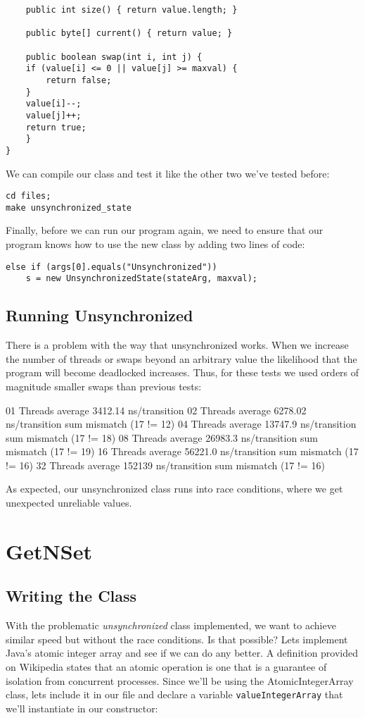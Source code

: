 \documentclass[11pt]{article}
\begin{document}
\begin{verbatim}
    public int size() { return value.length; }

    public byte[] current() { return value; }

    public boolean swap(int i, int j) {
	if (value[i] <= 0 || value[j] >= maxval) {
	    return false;
	}
	value[i]--;
	value[j]++;
	return true;
    }
}
\end{verbatim}

We can compile our class and test it like the other two we've
tested before:

\begin{verbatim}
cd files;
make unsynchronized_state
\end{verbatim}

Finally, before we can run our program again, we need to ensure that
our program knows how to use the new class by adding two lines of code:
\begin{verbatim}
else if (args[0].equals("Unsynchronized"))
    s = new UnsynchronizedState(stateArg, maxval);
\end{verbatim}

\subsection{Running Unsynchronized}
\label{sec-3-1}
There is a problem with the way that unsynchronized works. When we
increase the number of threads or swaps beyond an arbitrary value
the likelihood that the program will become deadlocked increases.
Thus, for these tests we used orders of magnitude smaller swaps
than previous tests:

01 Threads average 3412.14 ns/transition
02 Threads average 6278.02 ns/transition
sum mismatch (17 != 12)
04 Threads average 13747.9 ns/transition
sum mismatch (17 != 18)
08 Threads average 26983.3 ns/transition
sum mismatch (17 != 19)
16 Threads average 56221.0 ns/transition
sum mismatch (17 != 16)
32 Threads average 152139 ns/transition
sum mismatch (17 != 16)

As expected, our unsynchronized class runs into race conditions, where we
get unexpected unreliable values.

\section{GetNSet}
\label{sec-4}
\subsection{Writing the Class}
\label{sec-4-1}
With the problematic \emph{unsynchronized} class implemented, we want
to achieve similar speed but without the race conditions. Is that
possible? Lets implement Java's atomic integer array and see if
we can do any better. A definition provided on Wikipedia states
that an atomic operation is one that is a guarantee of isolation
from concurrent processes. Since we'll be using the
AtomicIntegerArray class, lets include it in our file and
declare a variable \verb~valueIntegerArray~ that we'll instantiate
in our constructor:
\end{document}
